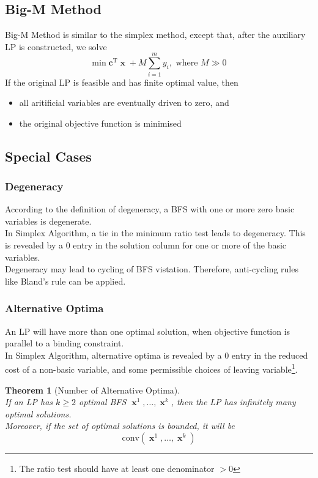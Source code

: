 \documentclass[12pt]{article}
\newcommand{\T}{\mathrm{T}}
\newtheorem{theorem}{Theorem}[section]
\theoremstyle{definition}
\DeclareMathOperator{\x}{\mathbf{x}}
\begin{document}
\subsection{Big-M Method}
Big-M Method is similar to the simplex method, except that, after the auxiliary LP is constructed, we solve
\[
\min \mathbf{c}^\T\x+M\sum_{i=1}^my_i, \text{ where }M\gg 0\
\]
If the original LP is feasible and has finite optimal value, then
\begin{itemize}
  \item all aritificial variables are eventually driven to zero, and
  \item the original objective function is minimised
\end{itemize}
\subsection{Special Cases}
\subsubsection{Degeneracy}
According to the definition of degeneracy, a BFS with one or more zero basic variables is degenerate.\\
In Simplex Algorithm, a tie in the minimum ratio test leads to degeneracy. This is revealed by a $0$ entry in the solution column for one or more of the basic variables.\\
Degeneracy may lead to cycling of BFS vistation. Therefore, anti-cycling rules like Bland's rule can be applied.
\subsubsection{Alternative Optima}
An LP will have more than one optimal solution, when objective function is parallel to a binding constraint.\\
In Simplex Algorithm, alternative optima is revealed by a $0$ entry in the reduced cost of a non-basic variable, and some permissible choices of leaving variable\footnote{The ratio test should have at least one denominator $>0$}.\\
\begin{theorem}[Number of Alternative Optima]
\hfill\\\normalfont If an LP has $k\geq 2$ optimal BFS $\x^1,\ldots, \x^k$, then the LP has infinitely many optimal solutions.\\
Moreover, if the set of optimal solutions is bounded, it will be 
\[
\text{conv}(\x^1,\ldots, \x^k)
\]
\end{theorem}
\end{document}
